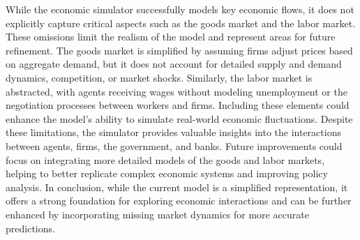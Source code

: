 While the economic simulator successfully models key economic flows, it does not explicitly capture critical aspects such as the goods market and the labor market. These omissions limit the realism of the model and represent areas for future refinement. The goods market is simplified by assuming firms adjust prices based on aggregate demand, but it does not account for detailed supply and demand dynamics, competition, or market shocks. Similarly, the labor market is abstracted, with agents receiving wages without modeling unemployment or the negotiation processes between workers and firms. Including these elements could enhance the model’s ability to simulate real-world economic fluctuations. Despite these limitations, the simulator provides valuable insights into the interactions between agents, firms, the government, and banks. Future improvements could focus on integrating more detailed models of the goods and labor markets, helping to better replicate complex economic systems and improving policy analysis. In conclusion, while the current model is a simplified representation, it offers a strong foundation for exploring economic interactions and can be further enhanced by incorporating missing market dynamics for more accurate predictions.

